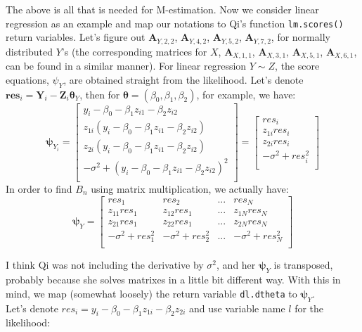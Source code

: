 \documentclass[]{article}
\begin{document}
The above is all that is needed for M-estimation. Now we consider linear regression as an example and map our notations to Qi's function \texttt{lm.scores()} return variables. Let's figure out $\pmb{A}_{Y,2,2}$, $\pmb{A}_{Y, 4,2}$, $\pmb{A}_{Y,5,2}$, $\pmb{A}_{Y, 7,2}$, for normally distributed $Y$'s (the corresponding matrices for $X$, $\pmb{A}_{X,1,1}$, $\pmb{A}_{X, 3,1}$, $\pmb{A}_{X,5,1}$, $\pmb{A}_{X, 6,1}$, can be found in a similar manner). For linear regression $Y\sim Z$, the score equations, $\psi_Y$, are obtained straight from the likelihood. Let's denote $\pmb{res}_i=\pmb{Y}_i - \pmb{Z}_i\pmb{\theta}_Y$, then for $\pmb{\theta} = (\beta_0, \beta_1, \beta_2)$, for example, we have:
\[
\pmb{\psi}_{Y_i} = 
	\begin{bmatrix}
		y_i - \beta_0 - \beta_1z_{i1} - \beta_2z_{i2}\\
		z_{1i}(y_i - \beta_0 - \beta_1z_{i1} - \beta_2z_{i2})\\
		z_{2i}(y_i - \beta_0 - \beta_1z_{i1} - \beta_2z_{i2})\\
		-\sigma^2 + (y_i - \beta_0 - \beta_1z_{i1} - \beta_2z_{i2})^2\\
 	\end{bmatrix} = 
	\begin{bmatrix}
		res_i\\
		z_{1i}res_i\\
		z_{2i}res_i\\
		-\sigma^2 + res_i^2\\
 	\end{bmatrix} 
\]
In order to find $B_n$ using matrix multiplication, we actually have:
\[
\pmb{\psi}_{Y} = 
	\begin{bmatrix}
		res_1 & res_2 & ... & res_N\\
		z_{11}res_1 & z_{12}res_1 & ... & z_{1N}res_N\\
		z_{21}res_1 & z_{22}res_1 & ... & z_{2N}res_N\\
		-\sigma^2 + res_1^2 & -\sigma^2 + res_2^2 & ... & -\sigma^2 + res_N^2\\
 	\end{bmatrix} 
\]

I think Qi was not including the derivative by $\sigma^2$, and her $\pmb{\psi}_{Y}$ is transposed, probably because she solves matrixes in a little bit different way. With this in mind, we map (somewhat loosely) the return variable \texttt{dl.dtheta} to $\pmb{\psi}_{Y}$.\\

Let's denote $res_i = y_i - \beta_0 - \beta_1z_{1i} - \beta_2z_{2i}$ and use variable name $l$ for the likelihood:  
\end{document}
